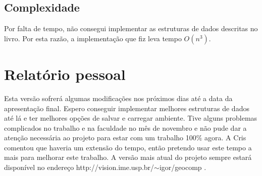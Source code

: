 \documentclass[11pt]{article} %
\begin{document}
\subsection{Complexidade}

Por falta de tempo, não consegui implementar as estruturas de dados descritas no livro. Por esta razão, a implementação que fiz leva tempo $O(n^3)$.

\section{Relatório pessoal}

Esta versão sofrerá algumas modificações nos próximos dias até a data da apresentação final. Espero conseguir implementar melhores estruturas de dados até lá e ter melhores opções de salvar e carregar ambiente. Tive alguns problemas complicados no trabalho e na faculdade no mês de novembro e não pude dar a atenção necessária ao projeto para estar com um trabalho 100$\%$ agora. A Cris comentou que haveria um extensão do tempo, então pretendo usar este tempo a mais para melhorar este trabalho. A versão mais atual do projeto sempre estará disponível no endereço http://vision.ime.usp.br/$\sim$igor/geocomp . 
\end{document}
